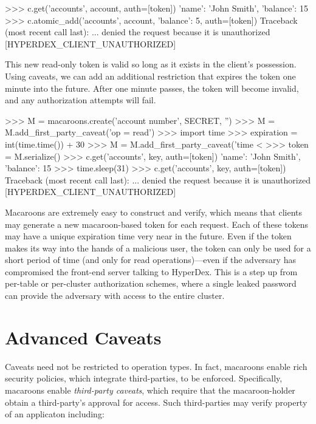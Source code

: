 \begin{pythoncode}
>>> c.get('accounts', account, auth=[token])
{'name': 'John Smith', 'balance': 15}
>>> c.atomic_add('accounts', account, {'balance': 5}, auth=[token])
Traceback (most recent call last):
... denied the request because it is unauthorized [HYPERDEX_CLIENT_UNAUTHORIZED]
\end{pythoncode}

This new read-only token is valid so long as it exists in the client's
possession.  Using caveats, we can add an additional restriction that expires
the token one minute into the future.  After one minute passes, the token will
become invalid, and any authorization attempts will fail.

\begin{pythoncode}
>>> M = macaroons.create('account number', SECRET, '')
>>> M = M.add_first_party_caveat('op = read')
>>> import time
>>> expiration = int(time.time()) + 30
>>> M = M.add_first_party_caveat('time < %
>>> token = M.serialize()
>>> c.get('accounts', key, auth=[token])
{'name': 'John Smith', 'balance': 15}
>>> time.sleep(31)
>>> c.get('accounts', key, auth=[token])
Traceback (most recent call last):
... denied the request because it is unauthorized [HYPERDEX_CLIENT_UNAUTHORIZED]
\end{pythoncode}

Macaroons are extremely easy to construct and verify, which means that clients
may generate a new macaroon-based token for each request.  Each of these tokens
may have a unique expiration time very near in the future.  Even if the token
makes its way into the hands of a malicious user, the token can only be used for
a short period of time (and only for read operations)---even if the adversary
has compromised the front-end server talking to HyperDex.  This is a step up
from per-table or per-cluster authorization schemes, where a single leaked
password can provide the adversary with access to the entire cluster.

\section{Advanced Caveats}

Caveats need not be restricted to operation types. In fact, macaroons enable
rich security policies, which integrate third-parties, to be enforced.
Specifically, macaroons enable {\em third-party caveats}, which require that the
macaroon-holder obtain a third-party's approval for access.  Such third-parties
may verify property of an applicaton including:

